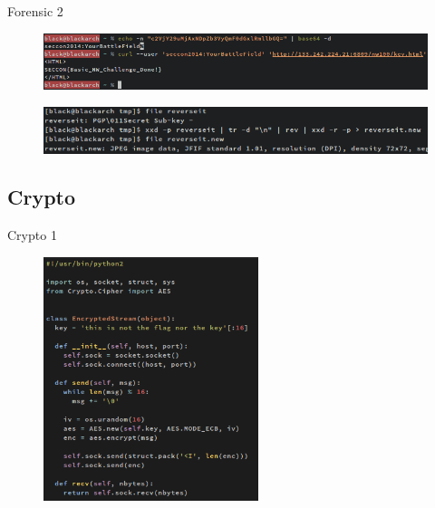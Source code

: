 \documentclass[compress]{beamer}
\begin{document}
\begin{frame}{Forensic 2}
	\begin{figure}
		\centering
		\includegraphics[width=\textwidth]{images/f23.png}
	\end{figure}
	\begin{figure}
		\centering
		\includegraphics[width=\textwidth]{images/f24.png}
	\end{figure}    
\end{frame}

\subsection{Crypto}

\begin{frame}{Crypto 1}
	\begin{figure}
		\centering
		\includegraphics[height=2.8in]{images/c12.png}
	\end{figure}
\end{frame}
\end{document}
